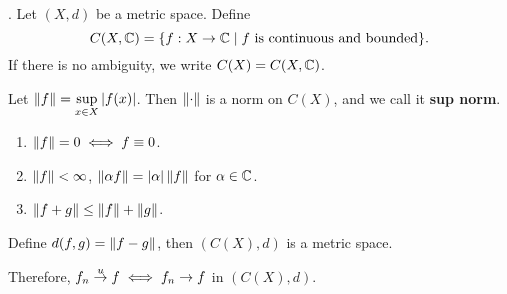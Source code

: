 . Let \((X, d)\) be a metric space. Define
\[
    C(X, \mathbb{C}) = \{f: X \rightarrow \mathbb{C} \mid f\text{ is continuous and bounded}\}.
\]
If there is no ambiguity, we write \(C(X) = C(X, \mathbb{C})\).

Let \(\left\lVert f \right\rVert = \displaystyle \sup_{x\in X} \left| f(x) \right|\). Then \(\left\lVert \cdot \right\rVert\) is a norm on \(C(X)\), and we call it \textbf{sup norm}.
\begin{enumerate}
    \item \(\left\lVert f \right\rVert = 0 \iff f \equiv 0\).
    \item \(\left\lVert f \right\rVert < \infty\), \(\left\lVert \alpha f \right\rVert = \left| \alpha \right| \left\lVert f \right\rVert\) for \(\alpha \in \mathbb{C}\).
    \item \(\left\lVert f + g \right\rVert \leq \left\lVert f \right\rVert + \left\lVert g \right\rVert\).
\end{enumerate}
Define \(d(f, g) = \left\lVert f - g \right\rVert\), then \((C(X), d)\) is a metric space.

Therefore, \(f_n \overset{u}{\rightarrow} f \iff f_n \rightarrow f\) in \((C(X), d)\).

\pagebreak
